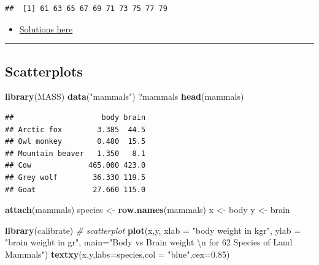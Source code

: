 \documentclass[]{article}
\def\tightlist{}
\newenvironment{Shaded}{\begin{snugshade}}{\end{snugshade}}
\newcommand{\KeywordTok}[1]{\textcolor[rgb]{0.13,0.29,0.53}{\textbf{{#1}}}}
\newcommand{\DataTypeTok}[1]{\textcolor[rgb]{0.13,0.29,0.53}{{#1}}}
\newcommand{\FloatTok}[1]{\textcolor[rgb]{0.00,0.00,0.81}{{#1}}}
\newcommand{\CharTok}[1]{\textcolor[rgb]{0.31,0.60,0.02}{{#1}}}
\newcommand{\StringTok}[1]{\textcolor[rgb]{0.31,0.60,0.02}{{#1}}}
\newcommand{\CommentTok}[1]{\textcolor[rgb]{0.56,0.35,0.01}{\textit{{#1}}}}
\newcommand{\NormalTok}[1]{{#1}}
\numberwithin{equation}{section}
\begin{document}
\begin{verbatim}
##  [1] 61 63 65 67 69 71 73 75 77 79
\end{verbatim}

\begin{itemize}
\tightlist
\item
  \href{http://idaejin.github.io/bcam-courses/rbasics/rbasics_sol.R}{Solutions
  here}
\end{itemize}

\begin{center}\rule{0.5\linewidth}{\linethickness}\end{center}

\subsection{Scatterplots}\label{scatterplots}

\begin{Shaded}
\begin{Highlighting}[]
\KeywordTok{library}\NormalTok{(MASS)}
\KeywordTok{data}\NormalTok{(}\StringTok{"mammals"}\NormalTok{)}
\NormalTok{?mammals}
\KeywordTok{head}\NormalTok{(mammals)}
\end{Highlighting}
\end{Shaded}

\begin{verbatim}
##                    body brain
## Arctic fox        3.385  44.5
## Owl monkey        0.480  15.5
## Mountain beaver   1.350   8.1
## Cow             465.000 423.0
## Grey wolf        36.330 119.5
## Goat             27.660 115.0
\end{verbatim}

\begin{Shaded}
\begin{Highlighting}[]
\KeywordTok{attach}\NormalTok{(mammals)}
\NormalTok{species <-}\StringTok{ }\KeywordTok{row.names}\NormalTok{(mammals)}
\NormalTok{x <-}\StringTok{ }\NormalTok{body}
\NormalTok{y <-}\StringTok{ }\NormalTok{brain}
\end{Highlighting}
\end{Shaded}

\begin{Shaded}
\begin{Highlighting}[]
\KeywordTok{library}\NormalTok{(calibrate)}
\CommentTok{# scatterplot}
\KeywordTok{plot}\NormalTok{(x,y, }\DataTypeTok{xlab =} \StringTok{"body weight in kgr"}\NormalTok{, }\DataTypeTok{ylab =} \StringTok{"brain weight in gr"}\NormalTok{, }
     \DataTypeTok{main=}\StringTok{"Body vs Brain weight }\CharTok{\textbackslash{}n}\StringTok{ for 62 Species of Land Mammals"}\NormalTok{)}
\KeywordTok{textxy}\NormalTok{(x,y,}\DataTypeTok{labs=}\NormalTok{species,}\DataTypeTok{col =} \StringTok{"blue"}\NormalTok{,}\DataTypeTok{cex=}\FloatTok{0.85}\NormalTok{) }
\end{Highlighting}
\end{Shaded}
\end{document}
